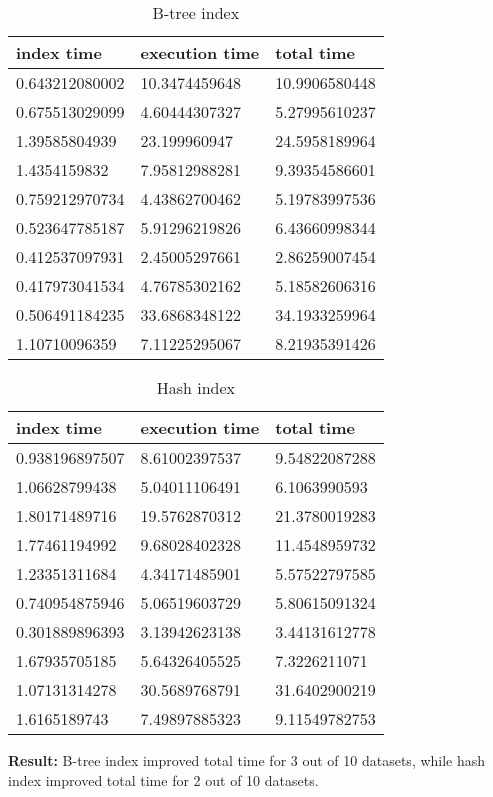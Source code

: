 \begin{itemize*}
\begin{table}[H]
\begin{center}
\begin{tabular}{|l|l|l|}
\hline
index time & execution time & total time                \\ \hline
0.643212080002 & 10.3474459648 & 10.9906580448 \\ \hline
0.675513029099 & 4.60444307327 & 5.27995610237 \\ \hline
1.39585804939  & 23.199960947  & 24.5958189964 \\ \hline
1.4354159832   & 7.95812988281 & 9.39354586601 \\ \hline
0.759212970734 & 4.43862700462 & 5.19783997536 \\ \hline
0.523647785187 & 5.91296219826 & 6.43660998344 \\ \hline
0.412537097931 & 2.45005297661 & 2.86259007454 \\ \hline
0.417973041534 & 4.76785302162 & 5.18582606316 \\ \hline
0.506491184235 & 33.6868348122 & 34.1933259964 \\ \hline
1.10710096359  & 7.11225295067 & 8.21935391426 \\ \hline
\end{tabular}
\end{center}
\caption{B-tree index}
\end{table}

\begin{table}[H]
\begin{center}
\begin{tabular}{|l|l|l|}
\hline
index time & execution time & total time     \\ \hline
0.938196897507 & 8.61002397537 & 9.54822087288 \\ \hline
1.06628799438  & 5.04011106491 & 6.1063990593  \\ \hline
1.80171489716  & 19.5762870312 & 21.3780019283 \\ \hline
1.77461194992  & 9.68028402328 & 11.4548959732 \\ \hline
1.23351311684  & 4.34171485901 & 5.57522797585 \\ \hline
0.740954875946 & 5.06519603729 & 5.80615091324 \\ \hline
0.301889896393 & 3.13942623138 & 3.44131612778 \\ \hline
1.67935705185  & 5.64326405525 & 7.3226211071  \\ \hline
1.07131314278  & 30.5689768791 & 31.6402900219 \\ \hline
1.6165189743   & 7.49897885323 & 9.11549782753 \\ \hline
\end{tabular}
\end{center}
\caption{Hash index}
\end{table}

\par \textbf{Result:} B-tree index improved total time for 3 out of 10 datasets, while hash index improved total time for 2 out of 10 datasets.
\end{itemize*}

